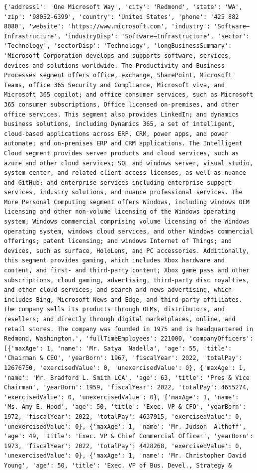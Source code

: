 \documentclass[
  letterpaper,
]{report}
\begin{document}
\begin{verbatim}
{'address1': 'One Microsoft Way', 'city': 'Redmond', 'state': 'WA', 'zip': '98052-6399', 'country': 'United States', 'phone': '425 882 8080', 'website': 'https://www.microsoft.com', 'industry': 'Software—Infrastructure', 'industryDisp': 'Software—Infrastructure', 'sector': 'Technology', 'sectorDisp': 'Technology', 'longBusinessSummary': 'Microsoft Corporation develops and supports software, services, devices and solutions worldwide. The Productivity and Business Processes segment offers office, exchange, SharePoint, Microsoft Teams, office 365 Security and Compliance, Microsoft viva, and Microsoft 365 copilot; and office consumer services, such as Microsoft 365 consumer subscriptions, Office licensed on-premises, and other office services. This segment also provides LinkedIn; and dynamics business solutions, including Dynamics 365, a set of intelligent, cloud-based applications across ERP, CRM, power apps, and power automate; and on-premises ERP and CRM applications. The Intelligent Cloud segment provides server products and cloud services, such as azure and other cloud services; SQL and windows server, visual studio, system center, and related client access licenses, as well as nuance and GitHub; and enterprise services including enterprise support services, industry solutions, and nuance professional services. The More Personal Computing segment offers Windows, including windows OEM licensing and other non-volume licensing of the Windows operating system; Windows commercial comprising volume licensing of the Windows operating system, windows cloud services, and other Windows commercial offerings; patent licensing; and windows Internet of Things; and devices, such as surface, HoloLens, and PC accessories. Additionally, this segment provides gaming, which includes Xbox hardware and content, and first- and third-party content; Xbox game pass and other subscriptions, cloud gaming, advertising, third-party disc royalties, and other cloud services; and search and news advertising, which includes Bing, Microsoft News and Edge, and third-party affiliates. The company sells its products through OEMs, distributors, and resellers; and directly through digital marketplaces, online, and retail stores. The company was founded in 1975 and is headquartered in Redmond, Washington.', 'fullTimeEmployees': 221000, 'companyOfficers': [{'maxAge': 1, 'name': 'Mr. Satya  Nadella', 'age': 55, 'title': 'Chairman & CEO', 'yearBorn': 1967, 'fiscalYear': 2022, 'totalPay': 12676750, 'exercisedValue': 0, 'unexercisedValue': 0}, {'maxAge': 1, 'name': 'Mr. Bradford L. Smith LCA', 'age': 63, 'title': 'Pres & Vice Chairman', 'yearBorn': 1959, 'fiscalYear': 2022, 'totalPay': 4655274, 'exercisedValue': 0, 'unexercisedValue': 0}, {'maxAge': 1, 'name': 'Ms. Amy E. Hood', 'age': 50, 'title': 'Exec. VP & CFO', 'yearBorn': 1972, 'fiscalYear': 2022, 'totalPay': 4637915, 'exercisedValue': 0, 'unexercisedValue': 0}, {'maxAge': 1, 'name': 'Mr. Judson  Althoff', 'age': 49, 'title': 'Exec. VP & Chief Commercial Officer', 'yearBorn': 1973, 'fiscalYear': 2022, 'totalPay': 4428268, 'exercisedValue': 0, 'unexercisedValue': 0}, {'maxAge': 1, 'name': 'Mr. Christopher David Young', 'age': 50, 'title': 'Exec. VP of Bus. Devel., Strategy & 
\end{verbatim}
\end{document}
